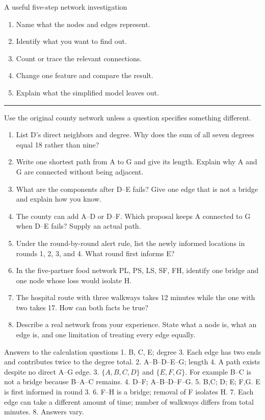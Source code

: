 \documentclass[11pt,letterpaper]{article}
\newcommand{\sect}[1]{\Needspace{7\baselineskip}\vspace{8pt}{\Large\bfseries\color{olive}#1}\par\vspace{1pt}\textcolor{gold}{\rule{\linewidth}{.75pt}}}
\begin{document}
\begin{pointbox}{A useful five-step network investigation}
\begin{enumerate}[leftmargin=1.5em,itemsep=1pt]
\item Name what the nodes and edges represent.
\item Identify what you want to find out.
\item Count or trace the relevant connections.
\item Change one feature and compare the result.
\item Explain what the simplified model leaves out.
\end{enumerate}
\end{pointbox}
\sect{Chapter review}
Use the original county network unless a question specifies something different.
\begin{enumerate}
\item List D's direct neighbors and degree. Why does the sum of all seven degrees equal 18 rather than nine?
\item Write one shortest path from A to G and give its length. Explain why A and G are connected without being adjacent.
\item What are the components after D--E fails? Give one edge that is not a bridge and explain how you know.
\item The county can add A--D or D--F. Which proposal keeps A connected to G when D--E fails? Supply an actual path.
\item Under the round-by-round alert rule, list the newly informed locations in rounds 1, 2, 3, and 4. What round first informs E?
\item In the five-partner food network PL, PS, LS, SF, FH, identify one bridge and one node whose loss would isolate H.
\item The hospital route with three walkways takes 12 minutes while the one with two takes 17. How can both facts be true?
\item Describe a real network from your experience. State what a node is, what an edge is, and one limitation of treating every edge equally.
\end{enumerate}
\begin{pointbox}{Answers to the calculation questions}
1. B, C, E; degree 3. Each edge has two ends and contributes twice to the degree total. 2. A--B--D--E--G; length 4. A path exists despite no direct A--G edge. 3. \(\{A,B,C,D\}\) and \(\{E,F,G\}\). For example B--C is not a bridge because B--A--C remains. 4. D--F; A--B--D--F--G. 5. B,C; D; E; F,G. E is first informed in round 3. 6. F--H is a bridge; removal of F isolates H. 7. Each edge can take a different amount of time; number of walkways differs from total minutes. 8. Answers vary.
\end{pointbox}
\end{document}
